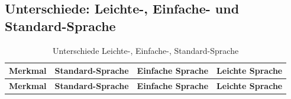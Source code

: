 \subsection{Unterschiede: Leichte-, Einfache- und Standard-Sprache} \label{uch:unterschiede}
\begin{longtable}{|p{}|p{}|p{}|p{}|}
	\caption{Unterschiede Leichte-, Einfache-, Standard-Sprache} \label{tab:sprachen} \\
	\hline
	\textbf{Merkmal} & \textbf{Standard-Sprache} & \textbf{Einfache Sprache} & \textbf{Leichte Sprache} \\
	\hline
	\endfirsthead
	
	\hline
	\textbf{Merkmal} & \textbf{Standard-Sprache} & \textbf{Einfache Sprache} & \textbf{Leichte Sprache} \\
	\hline
	\endhead
	

\end{longtable}
